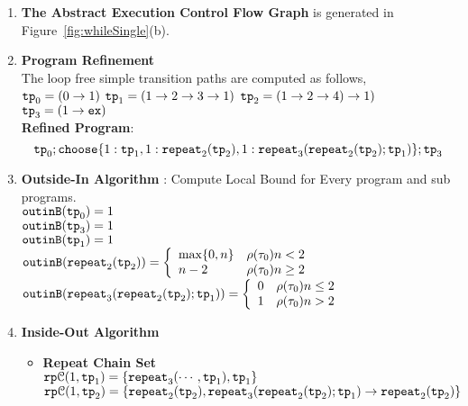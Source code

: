   \begin{enumerate}
    \item  \textbf{The Abstract Execution Control Flow Graph} is generated in Figure~\ref{fig:whileSingle}(b).
    \item \textbf{Program Refinement}
    \\
    The loop free simple transition paths are computed as follows,
     \\
    $\mathtt{tp}_0 = (0 \to 1)$
    \quad
    $\mathtt{tp}_1 = (1 \to 2 \to 3 \to 1)$
    \quad
    $\mathtt{tp}_2 = (1 \to 2 \to 4) \to 1)$
    \quad
    $\mathtt{tp}_3 = (1 \to \mathtt{ex})$
    \\
    \textbf{Refined Program}:
    \[
      \tpath_0 ; 
      \rpchoose{
        1: \tpath_1, 
        1: \rprepeat_2(\tpath_2),
        1: \rprepeat_3(\rprepeat_2(\tpath_2); \tpath_1)}; \tpath_3
      \]
      \item \textbf{Outside-In Algorithm} : Compute Local Bound for Every program and sub programs.
      \\
    $\mathtt{outinB}(\mathtt{tp}_0) = 1$
    \\
    $\mathtt{outinB}(\mathtt{tp}_3) = 1$
    \\
    $\mathtt{outinB}(\mathtt{tp}_1) = 1 $
    \\
    $\outinB(\rprepeat_2(\tpath_2)) = 
    \left\{
      \begin{array}{ll}
      \max\{0, n\} & \env(\trace_0) n < 2 \\
      n - 2 & \env(\trace_0)  n \geq 2
      \end{array} 
    \right.$
    \\
    $\outinB(\rprepeat_3(\rprepeat_2(\tpath_2); \tpath_1)) = 
    \left\{
      \begin{array}{ll}
      0 & \env(\trace_0) n \leq 2 \\
      1 & \env(\trace_0)  n > 2
      \end{array} 
    \right.$
    \\
    \item \textbf{Inside-Out Algorithm}
    \begin{itemize}
      \item \textbf{Repeat Chain Set}
      \\
      $\mathtt{rp}\mathcal{C}(1, \mathtt{tp}_1) = \{\mathtt{repeat}_3(\cdots, \mathtt{tp}_1), \mathtt{tp}_1\}$ 
      \\
      $\mathtt{rp}\mathcal{C}(1, \mathtt{tp}_2) = \{\mathtt{repeat}_2(\mathtt{tp}_2), \mathtt{repeat}_3(\mathtt{repeat}_2(\mathtt{tp}_2); \mathtt{tp}_1) \to \mathtt{repeat}_2(\mathtt{tp}_2)\}$ \\

\end{itemize}
\end{enumerate}
